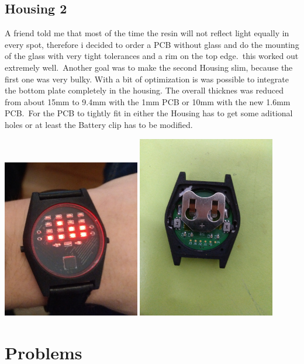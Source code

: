 \documentclass[12pt,a4paper,final]{article}
\begin{document}
\subsection{Housing 2}
A friend told me that most of the time the resin will not reflect light equally in every spot, therefore i decided to order a PCB without glass and do the mounting of the glass with very tight tolerances and a rim on the top edge.\
this worked out extremely well.\
Another goal was to make the second Housing slim, because the first one was very bulky. With a bit of optimization is was possible to integrate the bottom plate completely in the housing. The overall thicknes was reduced from about 15mm to 9.4mm with the 1mm PCB or 10mm with the new 1.6mm PCB.\
For the PCB to tightly fit in either the Housing has to get some aditional holes or at least the Battery clip has to be modified.\
\begin{center}
\includegraphics[width=0.45\textwidth]{../Pictures/Housing2.jpg} \includegraphics[width=0.45\textwidth]{../Pictures/Housing3b.jpg}
\end{center}
\section{Problems}
\end{document}
